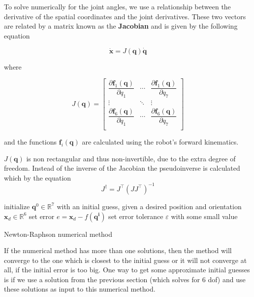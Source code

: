 To solve numerically for the joint angles, we use a relationship between the derivative of the spatial coordinates and the joint derivatives. These two vectors 
are related by a matrix known as the \textbf{Jacobian} and is given by the following equation

\begin{equation}
\mathbf{\dot{x}} = J( \mathbf{q} ) \mathbf{\dot{q}}
\end{equation}

where

\begin{equation}
J( \mathbf{q} ) = \begin{bmatrix}
\dfrac{\partial \mathbf{f}_1(\mathbf{q})}{\partial q_{1}} & \cdots & \dfrac{\partial \mathbf{f}_1(\mathbf{q})}{\partial q_{7}} \\
\vdots & \ddots & \vdots \\
\dfrac{\partial \mathbf{f}_6(\mathbf{q})}{\partial q_{1}} & \cdots & \dfrac{\partial \mathbf{f}_6(\mathbf{q})}{\partial q_{7}} \\
\end{bmatrix}
\end{equation}

and the functions $\mathbf{f}_i(\mathbf{q})$ are calculated using the robot's forward kinematics.

$J( \mathbf{q} )$ is non rectangular and thus non-invertible, due to the extra degree of freedom. Instead of the inverse of the Jacobian the pseudoinverse is calculated which by the 
equation
\begin{equation}
J^{\dagger} = J^\top ( J J^\top )^{-1}
\end{equation}

\begin{algorithm}[H]
\SetAlgoLined
initialize $\mathbf{q}^0 \in \mathbb{R}^{7}$ with an initial guess, given a desired position and orientation $\mathbf{x}_d \in \mathbb{R}^{6}$\;
set error $e = \mathbf{x}_d - f(\mathbf{q^i})$\;
set error tolerance $ε$ with some small value\;
\caption{Newton-Raphson numerical method}
\end{algorithm}

If the numerical method has more than one solutions, then the method will converge to the one which is closest to the initial guess or it will not converge at all, 
if the initial error is too big. One way to get some approximate initial guesses is if we use a solution from the previous section (which solves for 6 dof) and use these 
solutions as input to this numerical method.

